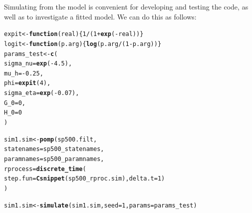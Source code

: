 \documentclass{beamer}\usepackage[]{graphicx}\usepackage[]{color}
\makeatletter
\newcommand{\hlnum}[1]{\textcolor[rgb]{0.686,0.059,0.569}{#1}}%
\newcommand{\hlopt}[1]{\textcolor[rgb]{0,0,0}{#1}}%
\newcommand{\hlstd}[1]{\textcolor[rgb]{0.345,0.345,0.345}{#1}}%
\newcommand{\hlkwa}[1]{\textcolor[rgb]{0.161,0.373,0.58}{\textbf{#1}}}%
\newcommand{\hlkwb}[1]{\textcolor[rgb]{0.69,0.353,0.396}{#1}}%
\newcommand{\hlkwc}[1]{\textcolor[rgb]{0.333,0.667,0.333}{#1}}%
\newcommand{\hlkwd}[1]{\textcolor[rgb]{0.737,0.353,0.396}{\textbf{#1}}}%
\newenvironment{kframe}{%
 \def\at@end@of@kframe{}%
 \ifinner\ifhmode%
  \def\at@end@of@kframe{\end{minipage}}%
  \begin{minipage}{\columnwidth}%
 \fi\fi%
 \def\FrameCommand##1{\hskip\@totalleftmargin \hskip-\fboxsep
 \colorbox{shadecolor}{##1}\hskip-\fboxsep
     \hskip-\linewidth \hskip-\@totalleftmargin \hskip\columnwidth}%
 \MakeFramed {\advance\hsize-\width
   \@totalleftmargin\z@ \linewidth\hsize
   \@setminipage}}%
 {\par\unskip\endMakeFramed%
 \at@end@of@kframe}
\newenvironment{knitrout}{}{} %
\makeatother
\begin{document}
\begin{frame}[fragile]

\bi

\item Simulating from the model is convenient for developing and testing the code, as well as to investigate a fitted model. We can do this as follows:

\ei

\begin{knitrout}\small
{}\color{fgcolor}\begin{kframe}
\begin{alltt}
\hlstd{expit}\hlkwb{<-}\hlkwa{function}\hlstd{(}\hlkwc{real}\hlstd{)\{}\hlnum{1}\hlopt{/}\hlstd{(}\hlnum{1}\hlopt{+}\hlkwd{exp}\hlstd{(}\hlopt{-}\hlstd{real))\}}
\hlstd{logit}\hlkwb{<-}\hlkwa{function}\hlstd{(}\hlkwc{p.arg}\hlstd{)\{}\hlkwd{log}\hlstd{(p.arg}\hlopt{/}\hlstd{(}\hlnum{1}\hlopt{-}\hlstd{p.arg))\}}
\hlstd{params_test} \hlkwb{<-} \hlkwd{c}\hlstd{(}
     \hlkwc{sigma_nu} \hlstd{=} \hlkwd{exp}\hlstd{(}\hlopt{-}\hlnum{4.5}\hlstd{),}
     \hlkwc{mu_h} \hlstd{=} \hlopt{-}\hlnum{0.25}\hlstd{,}
     \hlkwc{phi} \hlstd{=} \hlkwd{expit}\hlstd{(}\hlnum{4}\hlstd{),}
     \hlkwc{sigma_eta} \hlstd{=} \hlkwd{exp}\hlstd{(}\hlopt{-}\hlnum{0.07}\hlstd{),}
     \hlkwc{G_0} \hlstd{=} \hlnum{0}\hlstd{,}
     \hlkwc{H_0}\hlstd{=}\hlnum{0}
  \hlstd{)}

\hlstd{sim1.sim} \hlkwb{<-} \hlkwd{pomp}\hlstd{(sp500.filt,}
  \hlkwc{statenames}\hlstd{=sp500_statenames,}
  \hlkwc{paramnames}\hlstd{=sp500_paramnames,}
  \hlkwc{rprocess}\hlstd{=}\hlkwd{discrete_time}\hlstd{(}
    \hlkwc{step.fun}\hlstd{=}\hlkwd{Csnippet}\hlstd{(sp500_rproc.sim),}\hlkwc{delta.t}\hlstd{=}\hlnum{1}\hlstd{)}
\hlstd{)}

\hlstd{sim1.sim} \hlkwb{<-} \hlkwd{simulate}\hlstd{(sim1.sim,}\hlkwc{seed}\hlstd{=}\hlnum{1}\hlstd{,}\hlkwc{params}\hlstd{=params_test)}
\end{alltt}
\end{kframe}
\end{knitrout}

\end{frame}
\end{document}
